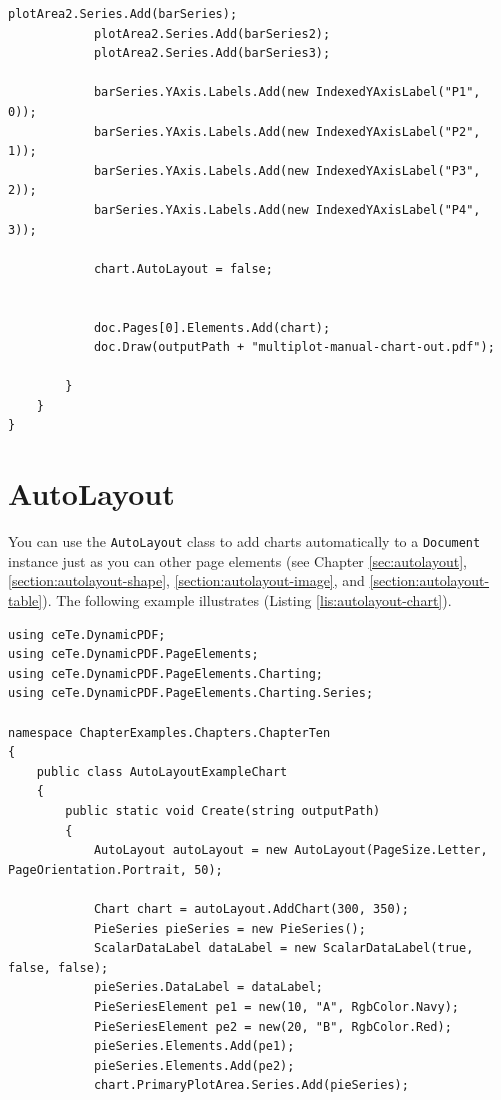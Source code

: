 \documentclass[american]{tufte-book}
\numberwithin{equation}{section}
\numberwithin{figure}{section}
\begin{document}
{\begin{lstlisting}[caption={A chart with two plot areas.},label={lis:two-plot-A-chart-with},basicstyle={\footnotesize\ttfamily},breaklines=true]
            plotArea2.Series.Add(barSeries);
            plotArea2.Series.Add(barSeries2);
            plotArea2.Series.Add(barSeries3);

            barSeries.YAxis.Labels.Add(new IndexedYAxisLabel("P1", 0));
            barSeries.YAxis.Labels.Add(new IndexedYAxisLabel("P2", 1));
            barSeries.YAxis.Labels.Add(new IndexedYAxisLabel("P3", 2));
            barSeries.YAxis.Labels.Add(new IndexedYAxisLabel("P4", 3));

            chart.AutoLayout = false;


            doc.Pages[0].Elements.Add(chart);
            doc.Draw(outputPath + "multiplot-manual-chart-out.pdf");

        }
    }
}
\end{lstlisting}
\leavevmode\egroup

\section{AutoLayout}
\label{section:autolayout-charts}
You can use the \texttt{AutoLayout} class to add charts automatically to a \texttt{Document} instance just as you can other page elements (see Chapter \ref{sec:autolayout}, \ref{section:autolayout-shape}, \ref{section:autolayout-image}, and \ref{section:autolayout-table}). The following example illustrates (Listing \ref{lis:autolayout-chart}).

\bgroup{}
\begin{lstlisting}[caption={Using AutoLayout to create a PDF document.},label={lis:autolayout-chart},basicstyle={\footnotesize\ttfamily},breaklines=true]
using ceTe.DynamicPDF;
using ceTe.DynamicPDF.PageElements;
using ceTe.DynamicPDF.PageElements.Charting;
using ceTe.DynamicPDF.PageElements.Charting.Series;

namespace ChapterExamples.Chapters.ChapterTen
{
    public class AutoLayoutExampleChart
    {
        public static void Create(string outputPath)
        {
            AutoLayout autoLayout = new AutoLayout(PageSize.Letter, PageOrientation.Portrait, 50);
            
            Chart chart = autoLayout.AddChart(300, 350);
            PieSeries pieSeries = new PieSeries();
            ScalarDataLabel dataLabel = new ScalarDataLabel(true, false, false);
            pieSeries.DataLabel = dataLabel;
            PieSeriesElement pe1 = new(10, "A", RgbColor.Navy);
            PieSeriesElement pe2 = new(20, "B", RgbColor.Red);
            pieSeries.Elements.Add(pe1);
            pieSeries.Elements.Add(pe2);
            chart.PrimaryPlotArea.Series.Add(pieSeries);


\end{lstlisting}}
\end{document}
